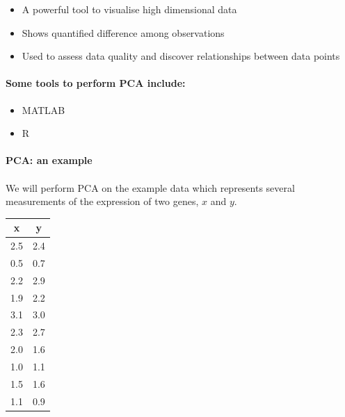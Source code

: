 \documentclass[11pt, oneside]{article}   	%
\begin{document}
\begin{itemize}

   \item A powerful tool to visualise high dimensional data 

   \item Shows quantified difference among observations

   \item Used to assess data quality and discover relationships between data points
\end{itemize}



\paragraph{Some tools to perform PCA include:}

\begin{itemize}
   \item MATLAB
   \item R
\end{itemize}



\paragraph{PCA: an example}
\paragraph{}

We will perform PCA on the example data which represents several measurements of the expression of two genes, $x$ and $y$.

\begin{center}
\begin{tabular}{c|c}
   x & y \\
   \hline
   2.5 & 2.4\\
   0.5 & 0.7\\
   2.2 & 2.9\\
   1.9 & 2.2\\
   3.1 & 3.0\\
   2.3 & 2.7\\
   2.0 & 1.6\\
   1.0 & 1.1\\
   1.5 & 1.6\\
   1.1 & 0.9\\
   \hline
\end{tabular}
\end{center}
\end{document}
